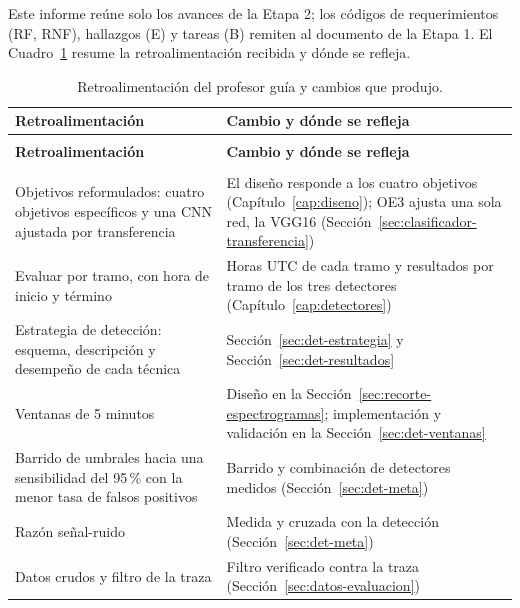 \documentclass[12pt,oneside,spanish,oldfontcommands]{memoir}
\begin{document}
Este informe reúne solo los avances de la Etapa 2; los códigos de
requerimientos (RF, RNF), hallazgos (E) y tareas (B) remiten al documento de
la Etapa 1. El Cuadro~\ref{tab:retroalimentacion} resume la retroalimentación
recibida y dónde se refleja.

{\small
\begin{longtable}{>{\raggedright\arraybackslash}p{4.4cm}>{\raggedright\arraybackslash}p{7.6cm}}
\caption{Retroalimentación del profesor guía y cambios que produjo.}\label{tab:retroalimentacion}\\
\toprule
\textbf{Retroalimentación} & \textbf{Cambio y dónde se refleja} \\
\midrule
\endfirsthead
\multicolumn{2}{l}{\itshape Cuadro \thetable{} (continuación)}\\
\toprule
\textbf{Retroalimentación} & \textbf{Cambio y dónde se refleja} \\
\midrule
\endhead
\midrule
\multicolumn{2}{r}{\itshape Continúa en la página siguiente}\\
\endfoot
\bottomrule
\endlastfoot
Objetivos reformulados: cuatro objetivos específicos y una CNN ajustada por
transferencia &
El diseño responde a los cuatro objetivos (Capítulo~\ref{cap:diseno}); OE3
ajusta una sola red, la VGG16 (Sección~\ref{sec:clasificador-transferencia}) \\
\addlinespace
Evaluar por tramo, con hora de inicio y término &
Horas UTC de cada tramo y resultados por tramo de los tres detectores
(Capítulo~\ref{cap:detectores}) \\
\addlinespace
Estrategia de detección: esquema, descripción y desempeño de cada técnica &
Sección~\ref{sec:det-estrategia} y Sección~\ref{sec:det-resultados} \\
\addlinespace
Ventanas de 5 minutos &
Diseño en la Sección~\ref{sec:recorte-espectrogramas}; implementación y
validación en la Sección~\ref{sec:det-ventanas} \\
\addlinespace
Barrido de umbrales hacia una sensibilidad del 95\,\% con la menor tasa de
falsos positivos &
Barrido y combinación de detectores medidos (Sección~\ref{sec:det-meta}) \\
\addlinespace
Razón señal-ruido &
Medida y cruzada con la detección (Sección~\ref{sec:det-meta}) \\
\addlinespace
Datos crudos y filtro de la traza &
Filtro verificado contra la traza (Sección~\ref{sec:datos-evaluacion}) \\
\end{longtable}
}
\end{document}
